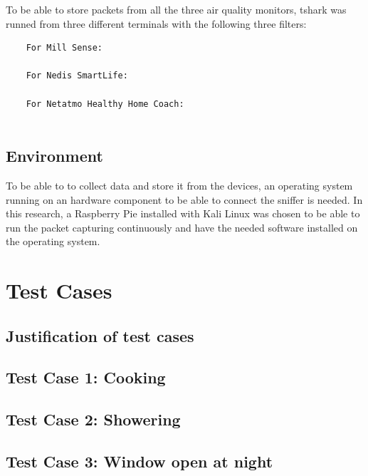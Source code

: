 To be able to store packets from all the three air quality monitors, tshark was runned from three different terminals with the following three filters:
\begin{verbatim}
    For Mill Sense:
        
    For Nedis SmartLife:
        
    For Netatmo Healthy Home Coach:
        
\end{verbatim}

\subsection{Environment}
To be able to to collect data and store it from the devices, an operating system running on an hardware component to be able to connect the sniffer is needed. In this research, a Raspberry Pie installed with Kali Linux was chosen to be able to run the packet capturing continuously and have the needed software installed on the operating system. 

\section{Test Cases}
\subsection{Justification of test cases}
\subsection{Test Case 1: Cooking}
\subsection{Test Case 2: Showering}
\subsection{Test Case 3: Window open at night}